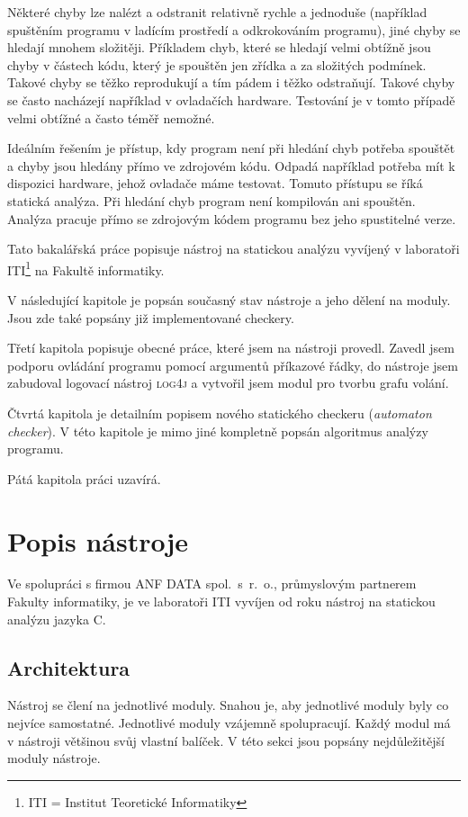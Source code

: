 \documentclass[11pt,final,oneside]{fithesis}
\begin{document}
Některé chyby lze nalézt a odstranit relativně rychle a jednoduše (například spuštěním programu v ladícím prostředí a odkrokováním programu), jiné chyby se hledají mnohem složitěji. Příkladem chyb, které se hledají velmi obtížně jsou chyby v částech kódu, který je spouštěn jen zřídka a za složitých podmínek. Takové chyby se těžko reprodukují a tím pádem i těžko odstraňují. Takové chyby se často nacházejí například v ovladačích hardware. Testování je v tomto případě velmi obtížné a často téměř nemožné.

Ideálním řešením je přístup, kdy program není při hledání chyb potřeba spouštět a chyby jsou hledány přímo ve zdrojovém kódu. Odpadá například potřeba mít k dispozici hardware, jehož ovladače máme testovat. Tomuto přístupu se říká statická analýza. Při hledání chyb program není kompilován ani spouštěn. Analýza pracuje přímo se zdrojovým kódem programu bez jeho spustitelné verze.

Tato bakalářská práce popisuje nástroj na statickou analýzu vyvíjený v laboratoři ITI\footnote{ITI = Institut Teoretické Informatiky} na Fakultě informatiky.

V následující kapitole je popsán současný stav nástroje a jeho dělení na moduly. Jsou zde také popsány již implementované checkery.

Třetí kapitola popisuje obecné práce, které jsem na nástroji provedl. Zavedl jsem podporu ovládání programu pomocí argumentů příkazové řádky, do nástroje jsem zabudoval logovací nástroj \textsc{log4j} a vytvořil jsem modul pro tvorbu grafu volání.

Čtvrtá kapitola je detailním popisem nového statického checkeru (\textit{automaton checker}). V této kapitole je mimo jiné kompletně popsán algoritmus analýzy programu.

Pátá kapitola práci uzavírá. 
 
\chapter{Popis nástroje}

Ve spolupráci s firmou ANF DATA spol.~s~r.~o., průmyslovým partnerem Fakulty informatiky, je ve laboratoři ITI vyvíjen od roku nástroj na statickou analýzu jazyka C.

\section{Architektura}
Nástroj se člení na jednotlivé moduly. Snahou je, aby jednotlivé moduly byly co nejvíce samostatné. Jednotlivé moduly vzájemně spolupracují. Každý modul má v nástroji většinou svůj vlastní balíček. V této sekci jsou popsány nejdůležitější moduly nástroje.
\end{document}
